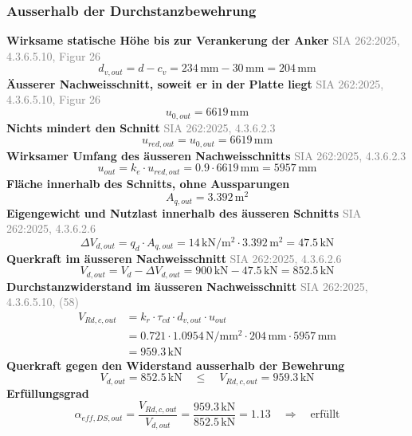 \documentclass[11pt,a4paper]{article}
\newcommand{\normref}[1]{{\small\textcolor{gray}{#1}}}
\begin{document}
\subsubsection{Ausserhalb der Durchstanzbewehrung}
\noindent\textbf{Wirksame statische Höhe bis zur Verankerung der Anker} \hfill \normref{SIA 262:2025, 4.3.6.5.10, Figur 26}
\begin{equation*}
d_{v,out} = d - c_v = 234\,\mathrm{mm} - 30\,\mathrm{mm} = 204\,\mathrm{mm}
\end{equation*}
\noindent\textbf{Äusserer Nachweisschnitt, soweit er in der Platte liegt} \hfill \normref{SIA 262:2025, 4.3.6.5.10, Figur 26}
\begin{equation*}
u_{0,out} = 6619\,\mathrm{mm}
\end{equation*}
\noindent\textbf{Nichts mindert den Schnitt} \hfill \normref{SIA 262:2025, 4.3.6.2.3}
\begin{equation*}
u_{red,out} = u_{0,out} = 6619\,\mathrm{mm}
\end{equation*}
\noindent\textbf{Wirksamer Umfang des äusseren Nachweisschnitts} \hfill \normref{SIA 262:2025, 4.3.6.2.3}
\begin{equation*}
u_{out} = k_e \cdot u_{red,out} = 0.9 \cdot 6619\,\mathrm{mm} = 5957\,\mathrm{mm}
\end{equation*}
\noindent\textbf{Fläche innerhalb des Schnitts, ohne Aussparungen}
\begin{equation*}
A_{q,out} = 3.392\,\mathrm{m}^{2}
\end{equation*}
\noindent\textbf{Eigengewicht und Nutzlast innerhalb des äusseren Schnitts} \hfill \normref{SIA 262:2025, 4.3.6.2.6}
\begin{equation*}
\Delta V_{d,out} = q_d \cdot A_{q,out} = 14\,\mathrm{kN}/\mathrm{m}^{2} \cdot 3.392\,\mathrm{m}^{2} = 47.5\,\mathrm{kN}
\end{equation*}
\noindent\textbf{Querkraft im äusseren Nachweisschnitt} \hfill \normref{SIA 262:2025, 4.3.6.2.6}
\begin{equation*}
V_{d,out} = V_d - \Delta V_{d,out} = 900\,\mathrm{kN} - 47.5\,\mathrm{kN} = 852.5\,\mathrm{kN}
\end{equation*}
\noindent\textbf{Durchstanzwiderstand im äusseren Nachweisschnitt} \hfill \normref{SIA 262:2025, 4.3.6.5.10, (58)}
\begin{equation*}
\begin{aligned}
  V_{Rd,c,out} &= k_r \cdot \tau_{cd} \cdot d_{v,out} \cdot u_{out} \\
  &= 0.721 \cdot 1.0954\,\mathrm{N}/\mathrm{mm}^{2} \cdot 204\,\mathrm{mm} \cdot 5957\,\mathrm{mm} \\
  &= 959.3\,\mathrm{kN}
\end{aligned}
\end{equation*}
\noindent\textbf{Querkraft gegen den Widerstand ausserhalb der Bewehrung}
\begin{equation*}
V_{d,out} = 852.5\,\mathrm{kN} \quad \le \quad V_{Rd,c,out} = 959.3\,\mathrm{kN}
\end{equation*}
\noindent\textbf{Erfüllungsgrad}
\begin{equation*}
\alpha_{eff,DS,out} = \frac{V_{Rd,c,out}}{V_{d,out}} = \frac{959.3\,\mathrm{kN}}{852.5\,\mathrm{kN}} = 1.13 \quad \Rightarrow \quad \text{erfüllt}
\end{equation*}
\end{document}
